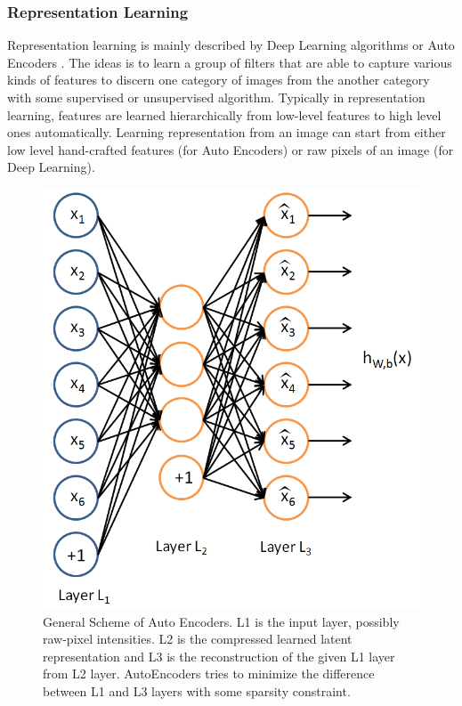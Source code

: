 \subsubsection{Representation Learning}
Representation learning is mainly described by Deep Learning 
algorithms\cite{krizhevsky2012imagenet} or Auto Encoders \cite{bengio2007scaling}. The ideas is to learn a group of filters that are able to capture various kinds of features to discern one category of images from the another category with some supervised or unsupervised algorithm. Typically in representation learning, features are learned hierarchically from low-level features to high level ones automatically. 
Learning representation from an image can start from either low level hand-crafted features (for Auto Encoders) or raw pixels of an image (for Deep Learning). 
\begin{figure}
	\centering
	\includegraphics[scale=.3]{introduction/fig/sparsecoding.png}
	\caption{General Scheme of Auto Encoders. L1 is the input layer, possibly raw-pixel intensities. L2 is the compressed learned latent representation and L3 is the reconstruction of the given L1 layer from L2 layer. AutoEncoders tries to minimize the difference between L1 and L3 layers with some sparsity constraint.}\label{fig:intro:sparse}
\end{figure}

